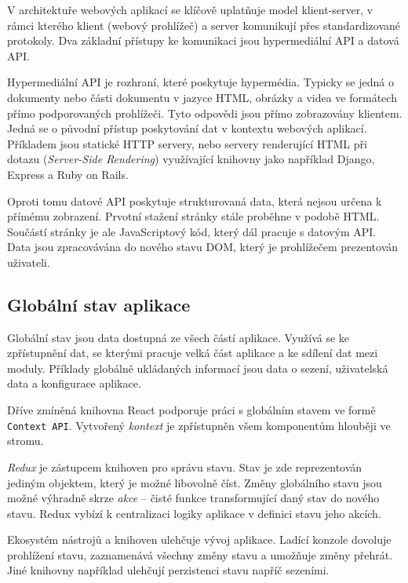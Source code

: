 V architektuře webových aplikací se klíčově uplatňuje model klient-server, v rámci kterého klient (webový prohlížeč) a server komunikují přes standardizované protokoly.
Dva základní přístupy ke komunikaci jsou hypermediální API a datová API.

Hypermediální API je rozhraní, které poskytuje hypermédia.
Typicky se jedná o dokumenty nebo části dokumentu v jazyce HTML, obrázky a videa ve formátech přímo podporovaných prohlížeči.
Tyto odpovědi jsou přímo zobrazovány klientem.
Jedná se o původní přístup poskytování dat v kontextu webových aplikací.
Příkladem jsou statické HTTP servery, nebo servery renderující HTML při dotazu (\emph{Server-Side Rendering}) využívající knihovny jako například Django, Express a Ruby on Rails.

Oproti tomu datové API poskytuje strukturovaná data, která nejsou určena k přímému zobrazení.
Prvotní stažení stránky stále proběhne v podobě HTML. 
Součástí stránky je ale JavaScriptový kód, který dál pracuje s datovým API.
Data jsou zpracovávána do nového stavu DOM, který je prohlížečem prezentován uživateli.


\subsection{Globální stav aplikace}

Globální stav jsou data dostupná ze všech částí aplikace.
Využívá se ke zpřístupnění dat, se kterými pracuje velká část aplikace a ke sdílení dat mezi moduly.
Příklady globálně ukládaných informací jsou data o sezení, uživatelská data a konfigurace aplikace. 

Dříve zmíněná knihovna React podporuje práci s globálním stavem ve formě \texttt{Context API}.
Vytvořený \emph{kontext} je zpřístupněn všem komponentům hlouběji ve stromu.

\emph{Redux} je zástupcem knihoven pro správu stavu.
Stav je zde reprezentován jediným objektem, který je možné libovolně číst.
Změny globálního stavu jsou možné výhradně skrze \emph{akce} -- čisté funkce transformující daný stav do nového stavu.
Redux vybízí k centralizaci logiky aplikace v definici stavu jeho akcích.

Ekosystém nástrojů a knihoven ulehčuje vývoj aplikace.
Ladící konzole dovoluje prohlížení stavu, zaznamenává všechny změny stavu a umožňuje změny přehrát.
Jiné knihovny například ulehčují perzistenci stavu napříč sezeními.

